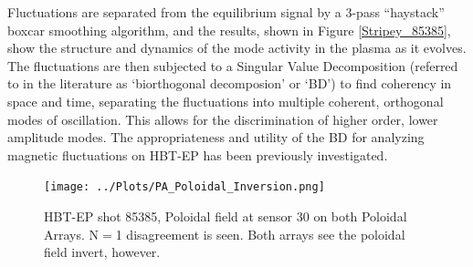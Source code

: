 \documentclass[aps,preprint,showpacs,superscriptaddress,groupedaddress]{revtex4}  %
\begin{document}
	Fluctuations are separated from the equilibrium signal by a 3-pass ``haystack'' boxcar smoothing algorithm, and the results, shown in Figure \ref{Stripey_85385}, show the structure and dynamics of the mode activity in the plasma as it evolves.  The fluctuations are then subjected to a Singular Value Decomposition (referred to in the literature as `biorthogonal decomposion' or `BD'\cite{de Wit}) to find coherency in space and time, separating the fluctuations into multiple coherent, orthogonal modes of oscillation.  This allows for the discrimination of higher order, lower amplitude modes.  The appropriateness and utility of the BD for analyzing magnetic fluctuations on HBT-EP has been previously investigated\cite{Levesque}.\par
\begin{figure}[t]
\centering
\texttt{[image: ../Plots/PA\_Poloidal\_Inversion.png]}\caption{HBT-EP shot 85385, Poloidal field at sensor 30 on both Poloidal Arrays.  N$=$1 disagreement is seen. Both arrays see the poloidal field invert, however.}
\label{PA_Poloidal_Inversion}
\end{figure}
\end{document}
